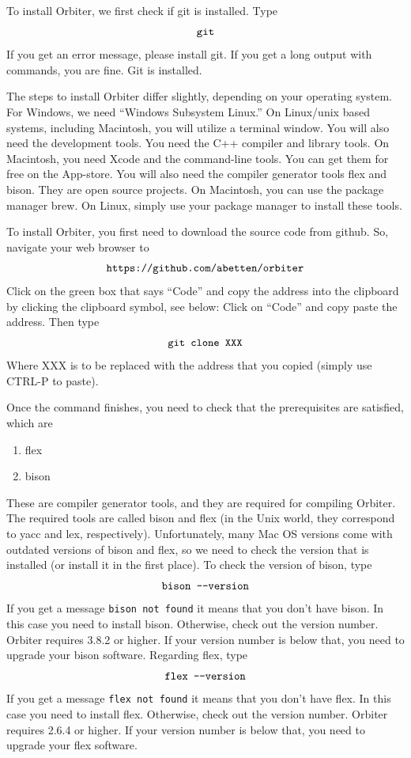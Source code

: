 
To install Orbiter, we first check if git is installed. Type
$$
\verb'git'
$$
If you get an error message, please install git. 
If you get a long output with commands, you are fine. 
Git is installed. 

\bigskip


The steps to install Orbiter differ slightly, 
depending on your operating system.
For Windows, we need ``Windows Subsystem Linux.''
On Linux/unix based systems, including Macintosh, 
you will utilize a terminal window. 
You will also need the development tools. 
You need the C++ compiler and library tools.
On Macintosh, you need Xcode and the command-line tools. 
You can get them for free on the App-store.
You will also need the compiler 
generator tools flex and bison.
They are open source projects. On Macintosh, you can use the package manager brew. 
On Linux, simply use your package manager to install these tools.

\bigskip


To install Orbiter, 
you first need to download the source code from github. 
So, navigate your web browser to
$$
\verb'https://github.com/abetten/orbiter'
$$
Click on the green box that says ``Code'' 
and copy the address into the clipboard 
by clicking the clipboard symbol, see below:
Click on ``Code'' and copy paste the address. 
Then type 
$$
\verb'git clone XXX' 
$$
Where XXX is to be replaced with the address 
that you copied (simply use CTRL-P to paste).

\bigskip

Once the command finishes, 
you need to check that the prerequisites are satisfied, which are 
\begin{enumerate}
\item
flex
\item
bison
\end{enumerate}
These are compiler generator tools, and they are required for compiling Orbiter. 
The required tools are called bison and flex (in the Unix world, they correspond to yacc and lex, respectively).
Unfortunately, many Mac OS versions come with outdated versions of bison and flex, so 
we need to check the version that is installed 
(or install it in the first place).
To check the version of bison, type 
$$
\verb'bison --version'
$$
If you get a message \verb'bison not found' 
it means that you don't have bison. 
In this case you need to install bison. 
Otherwise, check out the version number. 
Orbiter requires 3.8.2 or higher.
If your version number is below that, 
you need to upgrade your bison software.
Regarding flex, type 
$$
\verb'flex --version'
$$
If you get a message \verb'flex not found' 
it means that you don't have flex. 
In this case you need to install flex. 
Otherwise, check out the version number. 
Orbiter requires 2.6.4 or higher.
If your version number is below that, 
you need to upgrade your flex software.


